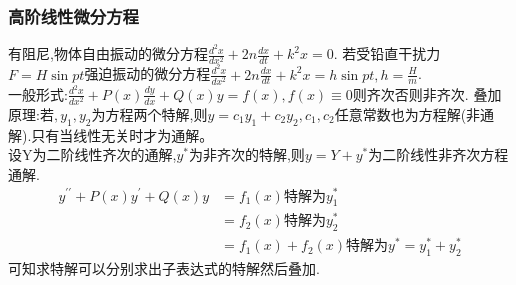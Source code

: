 \documentclass[10pt, a4paper, oneside]{ctexart}
\begin{document}
\begin{sloppypar}
	\subsubsection{高阶线性微分方程}
	有阻尼,物体自由振动的微分方程$\frac{d^2x}{dx^2} + 2n\frac{dx}{dt} + k^2x = 0$.
	若受铅直干扰力$F = H\sin pt$强迫振动的微分方程$\frac{d^2x}{dx^2} + 2n\frac{dx}{dt} + k^2x = h \sin pt, h = \frac{H}{m}$.\\
	一般形式:$\frac{d^2x}{dx^2} + P(x)\frac{dy}{dx} + Q(x)y = f(x), f(x)\equiv 0$则齐次否则非齐次.
	叠加原理:若$,y_1, y_2$为方程两个特解,则$y= c_1y_1 + c_2y_2, c_1,c_2$任意常数也为方程解(非通解).只有当线性无关时才为通解。\\
	设Y为二阶线性齐次的通解,$y^*$为非齐次的特解,则$y = Y + y^*$为二阶线性非齐次方程通解.
	\begin{align*}
		y^{\prime\prime } + P(x)y^{\prime} + Q(x)y & = f_1(x)\text{特解为}y_1^*                        \\
		                                           & = f_2(x)\text{特解为}y_2^*                        \\
		                                           & = f_1(x) + f_2(x)\text{特解为}y^* = y_1^* + y_2^*
	\end{align*}
	可知求特解可以分别求出子表达式的特解然后叠加.

\end{sloppypar}
\end{document}
